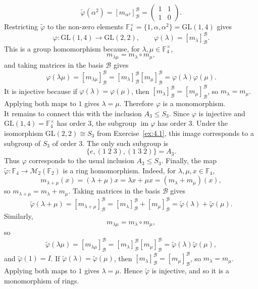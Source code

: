 \documentclass[../Odyssey_Project.tex]{subfiles}
\begin{document}
\begin{solution}
\[    \widetilde{\varphi}(\alpha^2)=[m_{\alpha^2}]_{\mathcal B}^{\mathcal B}=
    \begin{pmatrix}
        1&1\\
        1&0
    \end{pmatrix}.
\]
Restricting $\widetilde{\varphi}$ to the non-zero elements $\mathbb{F}_4^\times=\{1,\alpha,\alpha^2\}=\mathrm{GL}(1,4)$ gives
\[
    \varphi \colon \mathrm{GL}(1,4)\to \mathrm{GL}(2,2),
    \qquad
    \varphi(\lambda)=[m_\lambda]_{\mathcal B}^{\mathcal B}.
\]
This is a group homomorphism because, for $\lambda,\mu\in \mathbb{F}_4^\times$,
\[
    m_{\lambda\mu}=m_\lambda\circ m_\mu,
\]
and taking matrices in the basis $\mathcal B$ gives
\[
    \varphi(\lambda\mu)
    =[m_{\lambda\mu}]_{\mathcal B}^{\mathcal B}
    =[m_\lambda]_{\mathcal B}^{\mathcal B}[m_\mu]_{\mathcal B}^{\mathcal B}
    =\varphi(\lambda)\varphi(\mu).
\]
It is injective because if $\varphi(\lambda)=\varphi(\mu)$, then $[m_\lambda]_{\mathcal B}^{\mathcal B}=[m_\mu]_{\mathcal B}^{\mathcal B}$, so $m_\lambda=m_\mu$. Applying both maps to $1$ gives $\lambda=\mu$. Therefore $\varphi$ is a monomorphism.\\
It remains to connect this with the inclusion $A_3\leq S_3$. Since $\varphi$ is injective and $\mathrm{GL}(1,4)=\mathbb{F}_4^\times$ has order $3$, the subgroup $\operatorname{im}\varphi$ has order $3$. Under the isomorphism $\mathrm{GL}(2,2)\cong S_3$ from Exercise~\ref{ex:4.1}, this image corresponds to a subgroup of $S_3$ of order $3$. The only such subgroup is
\[
    \{e,(1\;2\;3),(1\;3\;2)\}=A_3.
\]
Thus $\varphi$ corresponds to the usual inclusion $A_3\leq S_3$.
Finally, the map $\widetilde{\varphi}\colon \mathbb{F}_4\to \mathcal{M}_2(\mathbb{F}_2)$ is a ring homomorphism. Indeed, for $\lambda,\mu,x\in \mathbb{F}_4$,
\[
    m_{\lambda+\mu}(x)=(\lambda+\mu)x=\lambda x+\mu x=(m_\lambda+m_\mu)(x),
\]
so $m_{\lambda+\mu}=m_\lambda+m_\mu$. Taking matrices in the basis $\mathcal B$ gives
\[
    \widetilde{\varphi}(\lambda+\mu)
    =[m_{\lambda+\mu}]_{\mathcal B}^{\mathcal B}
    =[m_\lambda]_{\mathcal B}^{\mathcal B}+[m_\mu]_{\mathcal B}^{\mathcal B}
    =\widetilde{\varphi}(\lambda)+\widetilde{\varphi}(\mu).
\]
Similarly,
\[
    m_{\lambda\mu}=m_\lambda\circ m_\mu,
\]
so
\[
    \widetilde{\varphi}(\lambda\mu)
    =[m_{\lambda\mu}]_{\mathcal B}^{\mathcal B}
    =[m_\lambda]_{\mathcal B}^{\mathcal B}[m_\mu]_{\mathcal B}^{\mathcal B}
    =\widetilde{\varphi}(\lambda)\widetilde{\varphi}(\mu),
\]
and $\widetilde{\varphi}(1)=I$. If $\widetilde{\varphi}(\lambda)=\widetilde{\varphi}(\mu)$, then $[m_\lambda]_{\mathcal B}^{\mathcal B}=[m_\mu]_{\mathcal B}^{\mathcal B}$, so $m_\lambda=m_\mu$. Applying both maps to $1$ gives $\lambda=\mu$. Hence $\widetilde{\varphi}$ is injective, and so it is a monomorphism of rings.
\end{solution}
\end{document}
